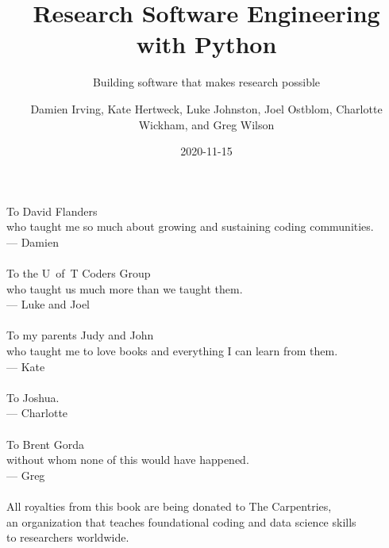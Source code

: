 \documentclass[
]{krantz}
\title{Research Software Engineering with Python}
\subtitle{Building software that makes research possible}
\author{Damien Irving, Kate Hertweck, Luke Johnston, Joel Ostblom, Charlotte Wickham, and Greg Wilson}
\date{2020-11-15}
\begin{document}
\maketitle


\thispagestyle{empty}

\begin{center}
To David Flanders\\
who taught me so much about growing and sustaining coding communities.\\
--- Damien\\

~\\

To the U~of~T Coders Group\\
who taught us much more than we taught them.\\
--- Luke and Joel\\

~\\

To my parents Judy and John\\
who taught me to love books and everything I can learn from them.\\
--- Kate\\

~\\

To Joshua.\\
--- Charlotte\\

~\\

To Brent Gorda\\
without whom none of this would have happened.\\
--- Greg\\

~\\

All royalties from this book are being donated to The Carpentries,\\
an organization that teaches foundational coding and data science skills\\
to researchers worldwide.
\end{center}

\setlength{\abovedisplayskip}{-5pt}
\setlength{\abovedisplayshortskip}{-5pt}
\end{document}
